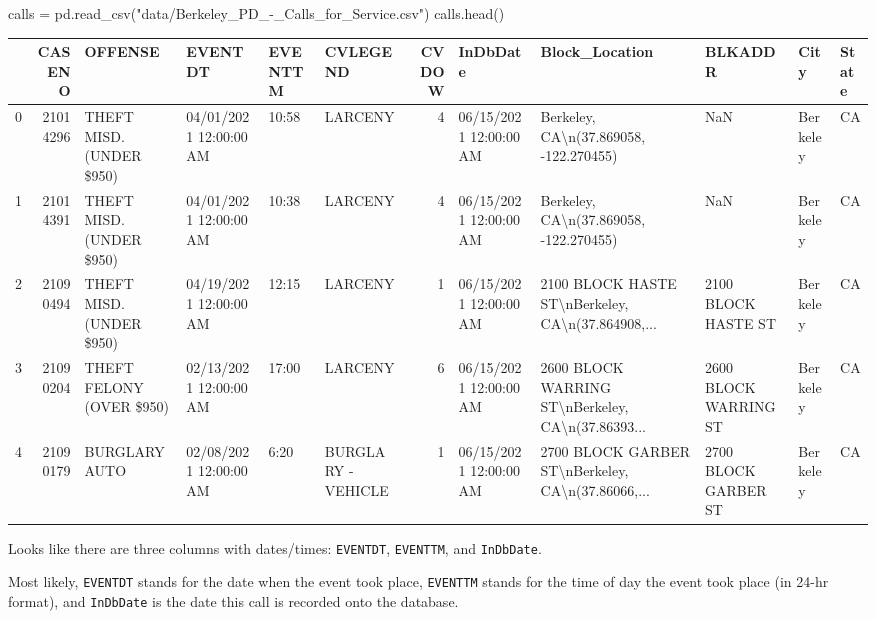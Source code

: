 \documentclass[
  letterpaper,
  DIV=11,
  numbers=noendperiod]{scrreprt}
\newenvironment{Shaded}{\begin{snugshade}}{\end{snugshade}}
\newcommand{\NormalTok}[1]{\textcolor[rgb]{0.00,0.23,0.31}{#1}}
\newcommand{\OperatorTok}[1]{\textcolor[rgb]{0.37,0.37,0.37}{#1}}
\newcommand{\StringTok}[1]{\textcolor[rgb]{0.13,0.47,0.30}{#1}}
\begin{document}
\begin{Shaded}
\begin{Highlighting}[]
\NormalTok{calls }\OperatorTok{=}\NormalTok{ pd.read\_csv(}\StringTok{"data/Berkeley\_PD\_{-}\_Calls\_for\_Service.csv"}\NormalTok{)}
\NormalTok{calls.head()}
\end{Highlighting}
\end{Shaded}

\begin{tabular}{lrllllrlllll}
\toprule
{} &    CASENO &                   OFFENSE &                 EVENTDT & EVENTTM &            CVLEGEND &  CVDOW &                InDbDate &                                     Block\_Location &                BLKADDR &      City & State \\
\midrule
0 &  21014296 &  THEFT MISD. (UNDER \$950) &  04/01/2021 12:00:00 AM &   10:58 &             LARCENY &      4 &  06/15/2021 12:00:00 AM &             Berkeley, CA\textbackslash n(37.869058, -122.270455) &                    NaN &  Berkeley &    CA \\
1 &  21014391 &  THEFT MISD. (UNDER \$950) &  04/01/2021 12:00:00 AM &   10:38 &             LARCENY &      4 &  06/15/2021 12:00:00 AM &             Berkeley, CA\textbackslash n(37.869058, -122.270455) &                    NaN &  Berkeley &    CA \\
2 &  21090494 &  THEFT MISD. (UNDER \$950) &  04/19/2021 12:00:00 AM &   12:15 &             LARCENY &      1 &  06/15/2021 12:00:00 AM &  2100 BLOCK HASTE ST\textbackslash nBerkeley, CA\textbackslash n(37.864908,... &    2100 BLOCK HASTE ST &  Berkeley &    CA \\
3 &  21090204 &  THEFT FELONY (OVER \$950) &  02/13/2021 12:00:00 AM &   17:00 &             LARCENY &      6 &  06/15/2021 12:00:00 AM &  2600 BLOCK WARRING ST\textbackslash nBerkeley, CA\textbackslash n(37.86393... &  2600 BLOCK WARRING ST &  Berkeley &    CA \\
4 &  21090179 &             BURGLARY AUTO &  02/08/2021 12:00:00 AM &    6:20 &  BURGLARY - VEHICLE &      1 &  06/15/2021 12:00:00 AM &  2700 BLOCK GARBER ST\textbackslash nBerkeley, CA\textbackslash n(37.86066,... &   2700 BLOCK GARBER ST &  Berkeley &    CA \\
\bottomrule
\end{tabular}

Looks like there are three columns with dates/times: \texttt{EVENTDT},
\texttt{EVENTTM}, and \texttt{InDbDate}.

Most likely, \texttt{EVENTDT} stands for the date when the event took
place, \texttt{EVENTTM} stands for the time of day the event took place
(in 24-hr format), and \texttt{InDbDate} is the date this call is
recorded onto the database.
\end{document}
